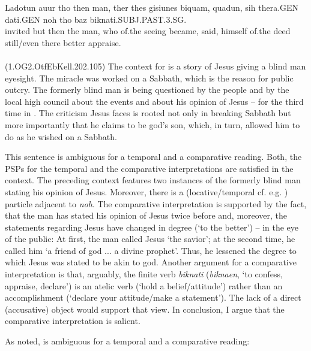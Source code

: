\documentclass[output=paper,
modfonts
]{langscibook}
\begin{document}
\ea\gll Ladotun auur tho then man, ther thes gisiunes biquam, quadun, sih thera.GEN dati.GEN noh tho baz biknati.SUBJ.PAST.3.SG.\\
       invited but then the man, who of.the seeing became, said, himself of.the deed still/even there better appraise.\\
\label{OG2_noch_blind_man} \\  (1.OG2.OtfEbKell.202.105)
\z
The context for  is a story of Jesus giving a blind man eyesight. The miracle was worked on a Sabbath, which is the reason for public outcry. The formerly blind man is being questioned by the people and by the local high council about the events and about his opinion of Jesus -- for the third time in . The criticism Jesus faces is rooted not only in breaking Sabbath but more importantly that he claims to be god's son, which, in turn, allowed him to do as he wished on a Sabbath.

This sentence is ambiguous for a temporal and a comparative reading. Both, the PSPs for the temporal and the comparative interpretations are satisfied in the context. The preceding context features two instances of the formerly blind man stating his opinion of Jesus. Moreover, there is a (locative/temporal cf. e.g. \citep{petrova2011}) particle adjacent to \textit{noh}. The comparative interpretation is supported by the fact, that the man has stated his opinion of Jesus twice before and, moreover, the statements regarding Jesus have changed in degree (`to the better') -- in the eye of the public: At first, the man called Jesus `the savior'; at the second time, he called him `a friend of god ... a divine prophet'. Thus, he lessened the degree to which Jesus was stated to be akin to god. Another argument for a comparative interpretation is that, arguably, the finite verb \textit{biknati} (\textit{biknaen}, `to confess, appraise, declare') is an atelic verb (`hold a belief/attitude') rather than an accomplishment (`declare your attitude/make a statement'). The lack of a direct (accusative) object would support that view. In conclusion, I argue that the comparative interpretation is salient.

As noted,  is ambiguous for a temporal and a comparative reading:
\end{document}
